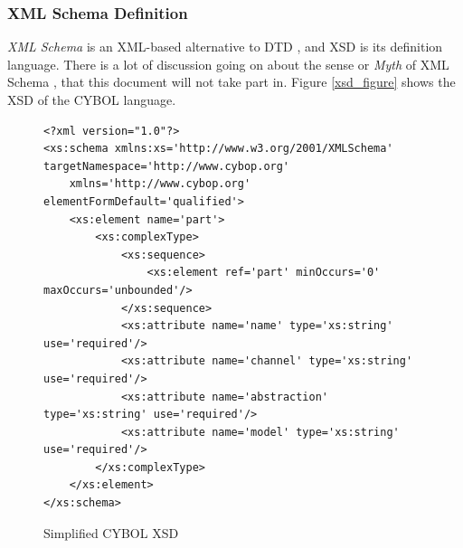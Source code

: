 %
%
%
%
%
%
%

\subsubsection{XML Schema Definition}
\label{xml_schema_definition_heading}

\emph{XML Schema} is an XML-based alternative to DTD \cite{w3schools}, and XSD
is its definition language. There is a lot of discussion going on about the
sense or \emph{Myth} of XML Schema \cite{browne}, that this document will not
take part in. Figure \ref{xsd_figure} shows the XSD of the CYBOL language.

\begin{figure}[ht]
    \bigskip
    \bigskip
    \begin{scriptsize}
        \begin{verbatim}
<?xml version="1.0"?>
<xs:schema xmlns:xs='http://www.w3.org/2001/XMLSchema' targetNamespace='http://www.cybop.org'
    xmlns='http://www.cybop.org' elementFormDefault='qualified'>
    <xs:element name='part'>
        <xs:complexType>
            <xs:sequence>
                <xs:element ref='part' minOccurs='0' maxOccurs='unbounded'/>
            </xs:sequence>
            <xs:attribute name='name' type='xs:string' use='required'/>
            <xs:attribute name='channel' type='xs:string' use='required'/>
            <xs:attribute name='abstraction' type='xs:string' use='required'/>
            <xs:attribute name='model' type='xs:string' use='required'/>
        </xs:complexType>
    </xs:element>
</xs:schema>
        \end{verbatim}
    \end{scriptsize}
    \caption{Simplified CYBOL XSD}
    \label{simplexsd_figure}
\end{figure}

